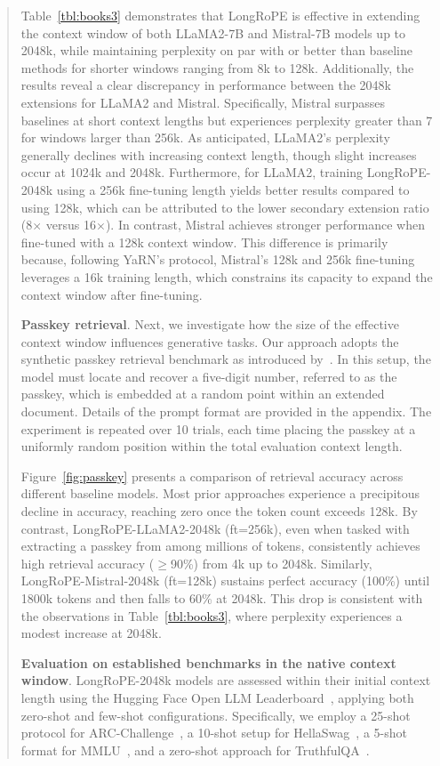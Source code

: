 \begin{abstract}
Table~\ref{tbl:books3} demonstrates that LongRoPE is effective in extending the context window of both LLaMA2-7B and Mistral-7B models up to 2048k, while maintaining perplexity on par with or better than baseline methods for shorter windows ranging from 8k to 128k. Additionally, the results reveal a clear discrepancy in performance between the 2048k extensions for LLaMA2 and Mistral. Specifically, Mistral surpasses baselines at short context lengths but experiences perplexity greater than 7 for windows larger than 256k. As anticipated, LLaMA2’s perplexity generally declines with increasing context length, though slight increases occur at 1024k and 2048k. Furthermore, for LLaMA2, training LongRoPE-2048k using a 256k fine-tuning length yields better results compared to using 128k, which can be attributed to the lower secondary extension ratio (8$\times$ versus 16$\times$). In contrast, Mistral achieves stronger performance when fine-tuned with a 128k context window. This difference is primarily because, following YaRN's protocol, Mistral’s 128k and 256k fine-tuning leverages a 16k training length, which constrains its capacity to expand the context window after fine-tuning.

\textbf{Passkey retrieval}. Next, we investigate how the size of the effective context window influences generative tasks. Our approach adopts the synthetic passkey retrieval benchmark as introduced by~\cite{passkey}. In this setup, the model must locate and recover a five-digit number, referred to as the passkey, which is embedded at a random point within an extended document. Details of the prompt format are provided in the appendix. The experiment is repeated over 10 trials, each time placing the passkey at a uniformly random position within the total evaluation context length.

Figure~\ref{fig:passkey} presents a comparison of retrieval accuracy across different baseline models. Most prior approaches experience a precipitous decline in accuracy, reaching zero once the token count exceeds 128k. By contrast, LongRoPE-LLaMA2-2048k (ft=256k), even when tasked with extracting a passkey from among millions of tokens, consistently achieves high retrieval accuracy ($\ge$90\%) from 4k up to 2048k. Similarly, LongRoPE-Mistral-2048k (ft=128k) sustains perfect accuracy (100\%) until 1800k tokens and then falls to 60\% at 2048k. This drop is consistent with the observations in Table~\ref{tbl:books3}, where perplexity experiences a modest increase at 2048k.

\textbf{Evaluation on established benchmarks in the native context window}. LongRoPE-2048k models are assessed within their initial context length using the Hugging Face Open LLM Leaderboard~\cite{huggingfaceboard}, applying both zero-shot and few-shot configurations. Specifically, we employ a 25-shot protocol for ARC-Challenge~\cite{allenai:arc}, a 10-shot setup for HellaSwag~\cite{zellers2019hellaswag}, a 5-shot format for MMLU~\cite{mmlu}, and a zero-shot approach for TruthfulQA~\cite{lin2021truthfulqa}.


\end{abstract}
